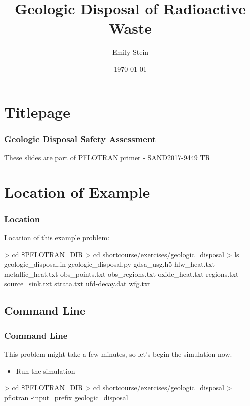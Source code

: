 \documentclass{beamer}
\begin{document}
\title{Geologic Disposal of Radioactive Waste}
\author{Emily Stein}
\date{\today}


\section{Titlepage}

\begin{frame}\frametitle{Geologic Disposal Safety Assessment}
These slides are part of PFLOTRAN primer - SAND2017-9449 TR
\end{frame}

\section{Location of Example}

\begin{frame}\frametitle{Location}

Location of this example problem:

\begin{semiverbatim}
> cd \$PFLOTRAN_DIR
> cd shortcourse/exercises/geologic_disposal
> ls
geologic_disposal.in
geologic_disposal.py
gdsa_usg.h5
hlw_heat.txt
metallic_heat.txt
obs_points.txt
obs_regions.txt
oxide_heat.txt
regions.txt
source_sink.txt
strata.txt
ufd-decay.dat
wfg.txt
\end{semiverbatim}

\end{frame}

\subsection{Command Line}
\begin{frame}[fragile]\frametitle{Command Line}
This problem might take a few minutes, so let's begin the simulation now.

\begin{itemize}
  \item Run the simulation
\end{itemize}

\begin{semiverbatim}
> cd \$PFLOTRAN_DIR
> cd shortcourse/exercises/geologic_disposal
> pflotran -input_prefix geologic_disposal
\end{semiverbatim}

\end{frame}
\end{document}
